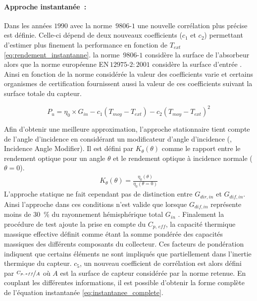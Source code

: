 \paragraph{Approche instantanée~:} %
\label{par:approche_instantanée}
Dans les années $1990$ avec la norme \,$9806$-$1$ une nouvelle corrélation plus
précise est définie. Celle-ci dépend de deux nouveaux coefficients ($c_{1}$ et $c_{2}$)
permettant d’estimer plus finement la performance en fonction de $T_{ext}$
\eqref{eq:rendement_instantanne}. la norme \,$9806$-$1$ considère la surface de
l’absorbeur alors que la norme européenne EN\,$12975$-$2:2001$ considère la surface
d’entrée \parencite{EN1297522001}. Ainsi en fonction de la norme considérée la valeur des
coefficients varie et certains organismes de certification fournissent aussi la
valeur de ces coefficients suivant la surface totale du capteur.

\begin{equation}\label{eq:rendement_instantanne}
    P_{u} = \eta_{0} \times G_{in}- c_{1} (T_{moy} - T_{ext}) - c_{2} (T_{moy} - T_{ext})^{2}
\end{equation}

Afin d’obtenir une meilleure approximation, l’approche stationnaire tient compte
de l’angle d’incidence en considérant un modificateur d’angle d’incidence (, Incidence Angle Modifier).
Il est défini par $K_{\theta}(\theta)$ comme le rapport entre le rendement optique pour un angle $\theta$
et le rendement optique à incidence normale ($\theta = 0$).
\begin{equation}\label{eq:IAM}
    \begin{aligned}
    K_{\theta}(\theta) = \frac{\eta_{0}(\theta)}{\eta_{0}(\theta = 0)}
    \end{aligned}
\end{equation}
L’approche statique ne fait cependant pas de distinction entre $G_{dir, in}$ et $G_{dif,
in}$. Ainsi l’approche dans ces conditions n’est valide que lorsque $G_{dif, in}$
représente moins de \SI{30}{\percent} du rayonnement hémisphérique total $G_{in}$ \parencite{Osorio2014}.
Finalement la procédure de test ajoute la prise en compte du $C_{p,\,eff}$, la capacité
thermique massique effective définit comme étant la somme pondérée des capacités
massiques des différents composants du collecteur. Ces facteurs de pondération indiquent que certains éléments
ne sont impliqués que partiellement dans l'inertie thermique du capteur. $c_{5}$, un nouveau coefficient de
corrélation est alors défini par $\nicefrac{C_{p,\,eff}}{A}$ où $A$ est la surface de
capteur considérée par la norme retenue. En couplant les différentes informations, il est
possible d’obtenir la forme complète de l’équation instantanée
\eqref{eq:instantanee_complete}.

